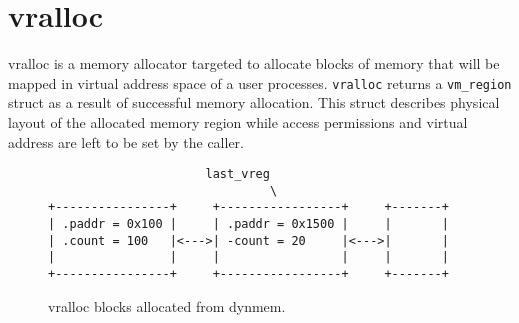 \chapter{vralloc}

\acf{vralloc} is a memory allocator targeted to allocate blocks of memory
that will be mapped in virtual address space of a user processes.
\verb+vralloc+ returns a \verb+vm_region+ struct as a result of successful
memory allocation. This struct describes physical layout of the allocated
memory region while access permissions and virtual address are left to be
set by the caller.



\begin{figure}
\begin{verbatim}
                      last_vreg
                               \
+----------------+     +-----------------+     +-------+
| .paddr = 0x100 |     | .paddr = 0x1500 |     |       |
| .count = 100   |<--->| -count = 20     |<--->|       |
|                |     |                 |     |       |
+----------------+     +-----------------+     +-------+
\end{verbatim}
\caption{vralloc blocks allocated from dynmem.}
\label{figure:vralloc_blocks}
\end{figure}